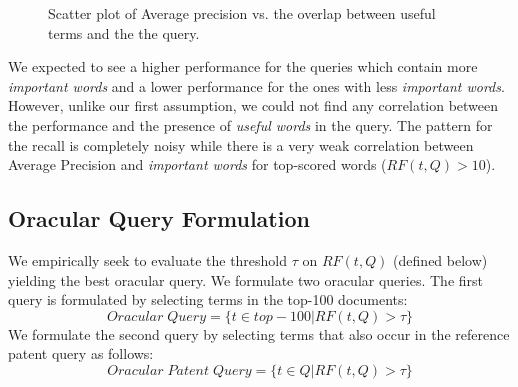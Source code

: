 \begin{figure}[t!]
\begin{centering}
ncludegraphics[width=5cm]{figs/greaterthan10-p.eps}}
\par\end{centering}

\protect\caption{Scatter plot of Average precision vs. the overlap between useful terms and the the query.}
\label{fig:overlap-p}
\end{figure}
We expected to see a higher performance for the queries which contain more \textit{important words} and a lower performance for the ones with less \textit{important words}. However, unlike our first assumption, we could not find any correlation between the performance and the presence of \textit{useful words} in the query. The pattern for the recall is completely noisy while there is a very weak correlation between Average Precision and \textit{important words} for top-scored words ($RF(t, Q)>10$).  


\subsection{Oracular Query Formulation}
We empirically seek to evaluate the threshold $\tau$ on $RF(t,Q)$ (defined below) yielding the best oracular query.
We formulate two oracular queries. The first query is formulated by selecting terms in the top-100 documents:
\begin{equation}
Oracular \; Query = \{t \in top-100|RF(t, Q)>\tau\}   
 \label{eq:score}
\end{equation}
We formulate the second query by selecting terms that also occur in the reference patent query as follows:
\begin{equation}
 Oracular \; Patent \; Query = \{t\in Q|RF(t, Q)>\tau\}   
 \label{eq:score}
\end{equation}
%

